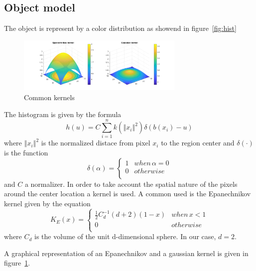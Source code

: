 \documentclass[a4paper,12pt]{article}
\begin{document}
\subsection{Object model}
The object is represent by a color distribution as showend in figure~\ref{fig:hist}

\begin{figure}[b]
        \centering
        \includegraphics[width=8cm]{kernels.png}
        \caption{Common kernels}
		\label{fig:kernel}
\end{figure}




The histogram is given by the formula
$$
h(u) =  C \sum_{i=1}^{n} k\left({\left\Vert x_i \right\Vert}^2\right) \delta\left(b(x_i) - u \right)
$$
where $\left\Vert x_i \right\Vert^2$ is the normalized distace from pixel $x_i$ to the region center and $\delta(\cdot)$ is the function
$$
\delta(\alpha) = \begin{cases}
1 & when\,  \alpha=0 \\
0 & otherwise \\
\end{cases}
$$
and $C$ a normalizer. In order to take account the spatial nature of the pixels around the center location a kernel is used. A common used is the  Epanechnikov kernel given by the equation
$$
K_E(x) = \begin{cases}
\frac{1}{2}C_d^{-1}(d+2)(1 - x) & when\,  x<1 \\
0 & otherwise \\
\end{cases}
$$
where $C_d$ is the volume of the unit d-dimensional sphere. In our case, $d = 2$.

A graphical representation of an Epanechnikov and a gaussian kernel is given in figure~\ref{fig:kernel}.
\end{document}
